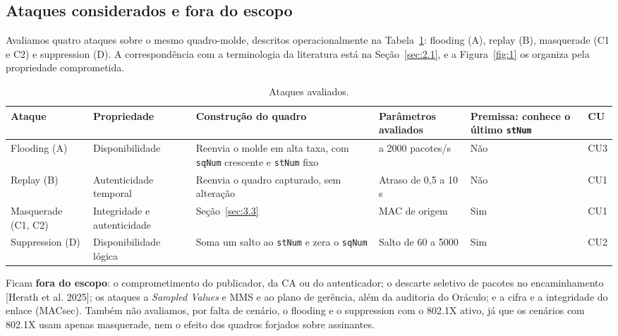 \documentclass[12pt]{article}
\newcommand{\cit}[2]{[#1]\nocite{#2}}
\begin{document}
\subsection{Ataques considerados e fora do escopo}\label{sec:3.5}

Avaliamos quatro ataques sobre o mesmo quadro-molde, descritos operacionalmente na Tabela~\ref{tab:6}: flooding (A), replay (B), masquerade (C1 e C2) e suppression (D). A correspondência com a terminologia da literatura está na Seção~\ref{sec:2.1}, e a Figura~\ref{fig:1} os organiza pela propriedade comprometida.

\begin{table}[!t]
\centering
\caption{Ataques avaliados.}\label{tab:6}
\footnotesize
\renewcommand{\arraystretch}{1.25}
\begin{tabularx}{\linewidth}{|>{\hsize=0.990\hsize\raggedright\arraybackslash}X|>{\hsize=1.334\hsize\raggedright\arraybackslash}X|>{\hsize=1.650\hsize\raggedright\arraybackslash}X|>{\hsize=0.904\hsize\raggedright\arraybackslash}X|>{\hsize=0.818\hsize\raggedright\arraybackslash}X|>{\hsize=0.303\hsize\raggedright\arraybackslash}X|}
\hline
\textbf{Ataque} & \textbf{Propriedade} & \textbf{Construção do quadro} & \textbf{Parâmetros avaliados} & \textbf{Premissa: conhece o último \texttt{stNum}} & \textbf{CU} \\ \hline
Flooding (A) & Disponibilidade & Reenvia o molde em alta taxa, com \texttt{sqNum} crescente e \texttt{stNum} fixo & 50 a 2000 pacotes/s & Não & CU3 \\ \hline
Replay (B) & Autenticidade temporal & Reenvia o quadro capturado, sem alteração & Atraso de 0,5 a 10 s & Não & CU1 \\ \hline
Masquerade (C1, C2) & Integridade e autenticidade & Seção~\ref{sec:3.3} & MAC de origem & Sim & CU1 \\ \hline
Suppression (D) & Disponibilidade lógica & Soma um salto ao \texttt{stNum} e zera o \texttt{sqNum} & Salto de 60 a 5000 & Sim & CU2 \\ \hline
\end{tabularx}
\end{table}

Ficam \textbf{fora do escopo}: o comprometimento do publicador, da CA ou do autenticador; o descarte seletivo de pacotes no encaminhamento \cit{Herath et al. 2025}{herath2025evaluation}; os ataques a \emph{Sampled Values} e MMS e ao plano de gerência, além da auditoria do Oráculo; e a cifra e a integridade do enlace (MACsec). Também não avaliamos, por falta de cenário, o flooding e o suppression com o 802.1X ativo, já que os cenários com 802.1X usam apenas masquerade, nem o efeito dos quadros forjados sobre assinantes.
\end{document}
